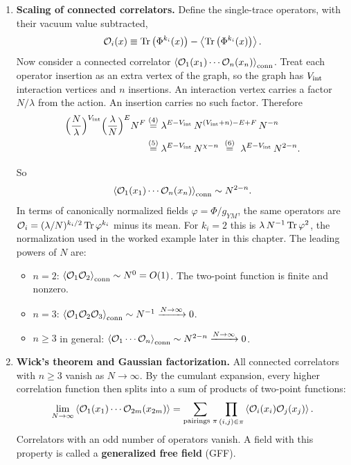 \begin{keyresult}
\begin{enumerate}[leftmargin=*]
\item \textbf{Scaling of connected correlators.}
Define the single-trace operators, with their vacuum value subtracted,
\[
\mathcal{O}_i(x) \equiv \operatorname{Tr}\big(\Phi^{k_i}(x)\big) - \Braket{\operatorname{Tr}\big(\Phi^{k_i}(x)\big)} .
\]
Now consider a connected correlator $\braket{\mathcal{O}_1(x_1) \cdots \mathcal{O}_n(x_n)}_{\text{conn}}$. Treat each operator insertion as an extra vertex of the graph, so the graph has $V_{\rm int}$ interaction vertices and $n$ insertions. An interaction vertex carries a factor $N/\lambda$ from the action. An insertion carries no such factor. Therefore
\begin{align}
\Big(\frac N\lambda\Big)^{V_{\rm int}}\Big(\frac\lambda N\Big)^{E}N^F
&\overset{(4)}{=} \lambda^{E-V_{\rm int}}\,N^{(V_{\rm int}+n)-E+F}\,N^{-n} \notag\\
&\overset{(5)}{=} \lambda^{E-V_{\rm int}}\,N^{\chi-n}
\ \overset{(6)}{=}\ \lambda^{E-V_{\rm int}}\,N^{2-n} . \notag
\end{align}
\quad
{}\quad
{}

So
\[
\Braket{\mathcal{O}_1(x_1) \cdots \mathcal{O}_n(x_n)}_{\text{conn}} \sim N^{2-n} .
\]
In terms of canonically normalized fields $\varphi=\Phi/g_{YM}$, the same operators are
$\mathcal O_i=(\lambda/N)^{k_i/2}\operatorname{Tr}\varphi^{k_i}$ minus its mean. For $k_i=2$ this is $\lambda\,N^{-1}\operatorname{Tr}\varphi^2$, the normalization used in the worked example later in this chapter. The leading powers of $N$ are:
\begin{itemize}
\item $n = 2$: $\braket{\mathcal{O}_1 \mathcal{O}_2}_{\text{conn}} \sim N^0 = O(1)$. The two-point function is finite and nonzero.
\item $n = 3$: $\braket{\mathcal{O}_1 \mathcal{O}_2 \mathcal{O}_3}_{\text{conn}} \sim N^{-1} \xrightarrow{N\to\infty} 0$.
\item $n \ge 3$ in general: $\braket{\mathcal{O}_1 \cdots \mathcal{O}_n}_{\text{conn}} \sim N^{2-n} \xrightarrow{N\to\infty} 0$.
\end{itemize}

\item \textbf{Wick's theorem and Gaussian factorization.}
All connected correlators with $n \ge 3$ vanish as $N \to \infty$. By the cumulant expansion, every higher correlation function then splits into a sum of products of two-point functions:
\[
\lim_{N\to\infty} \Braket{\mathcal{O}_1(x_1) \cdots \mathcal{O}_{2m}(x_{2m})} = \sum_{\text{pairings } \pi} \prod_{(i, j) \in \pi} \Braket{\mathcal{O}_i(x_i)\mathcal{O}_j(x_j)} .
\]
Correlators with an odd number of operators vanish. A field with this property is called a \textbf{generalized free field} (GFF).


\end{enumerate}
\end{keyresult}
